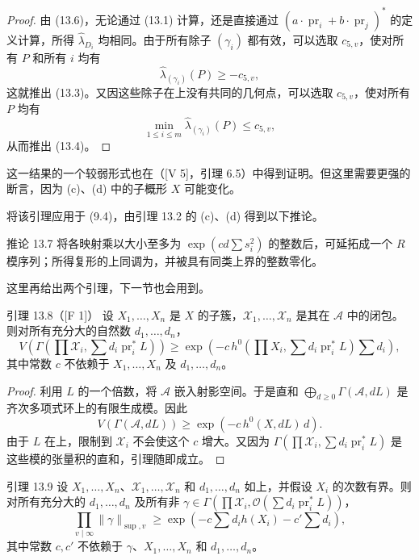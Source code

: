 \begin{proof}
由 (13.6)，无论通过 (13.1) 计算，还是直接通过 $(a\cdot\operatorname{pr}_i+b\cdot\operatorname{pr}_j)^*$ 的定义计算，所得 $\hat\lambda_{D_i}$ 均相同。由于所有除子 $(\gamma_i)$ 都有效，可以选取 $c_{5,v}$，使对所有 $P$ 和所有 $i$ 均有
\[
\hat\lambda_{(\gamma_i)}(P)\ge-c_{5,v},
\]
这就推出 (13.3)。又因这些除子在上没有共同的几何点，可以选取 $c_{5,v}$，使对所有 $P$ 均有
\[
\min_{1\le i\le m}\hat\lambda_{(\gamma_i)}(P)\le c_{5,v},
\]
从而推出 (13.4)。
\end{proof}

这一结果的一个较弱形式也在（[V 5]，引理 6.5）中得到证明。但这里需要更强的断言，因为 (c)、(d) 中的子概形 $X$ 可能变化。

将该引理应用于  (9.4)，由引理 13.2 的 (c)、(d) 得到以下推论。
\begin{statement}{推论 13.7}
将各映射乘以大小至多为 $\exp(cd\sum s_i^2)$ 的整数后，可延拓成一个 $R$ 模序列；所得复形的上同调为，并被具有同类上界的整数零化。
\end{statement}
这里再给出两个引理，下一节也会用到。
\begin{statement}{引理 13.8（[F 1]）}
设 $X_1,\ldots,X_n$ 是 $X$ 的子簇，$\mathscr X_1,\ldots,\mathscr X_n$ 是其在 $\mathscr A$ 中的闭包。则对所有充分大的自然数 $d_1,\ldots,d_n$，
\[
V\!\left(\Gamma\!\left(\prod\mathscr X_i,\sum d_i\operatorname{pr}_i^*L\right)\right)
\ge\exp\!\left(-c\,h^0\!\left(\prod X_i,\sum d_i\operatorname{pr}_i^*L\right)\sum d_i\right),
\]
其中常数 $c$ 不依赖于 $X_1,\ldots,X_n$ 及 $d_1,\ldots,d_n$。
\end{statement}
\begin{proof}
利用 $L$ 的一个倍数，将 $\mathscr A$ 嵌入射影空间。于是直和 $\bigoplus_{d\ge0}\Gamma(\mathscr A,dL)$ 是齐次多项式环上的有限生成模。因此
\[
V(\Gamma(\mathscr A,dL))\ge\exp(-c\,h^0(X,dL)\,d).
\]
由于 $L$ 在上，限制到 $\mathscr X_i$ 不会使这个 $c$ 增大。又因为 $\Gamma(\prod\mathscr X_i,\sum d_i\operatorname{pr}_i^*L)$ 是这些模的张量积的直和，引理随即成立。
\end{proof}
\begin{statement}{引理 13.9}
设 $X_1,\ldots,X_n$、$\mathscr X_1,\ldots,\mathscr X_n$ 和 $d_1,\ldots,d_n$ 如上，并假设 $X_i$ 的次数有界。则对所有充分大的 $d_1,\ldots,d_n$ 及所有非
$\gamma\in\Gamma(\prod\mathscr X_i,\mathcal O(\sum d_i\operatorname{pr}_i^*L))$，
\[
\prod_{v\mid\infty}\|\gamma\|_{\sup,v}\ge\exp\!\left(-c\sum d_i h(X_i)-c'\sum d_i\right),
\]
其中常数 $c,c'$ 不依赖于 $\gamma$、$X_1,\ldots,X_n$ 和 $d_1,\ldots,d_n$。
\end{statement}
